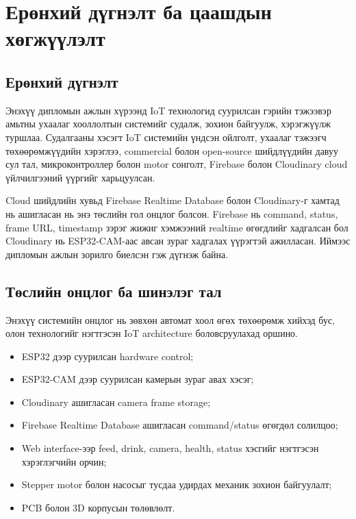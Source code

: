 \documentclass[12pt,a4paper]{report}
\begin{document}
\chapter{Ерөнхий дүгнэлт ба цаашдын хөгжүүлэлт}

\section{Ерөнхий дүгнэлт}

Энэхүү дипломын ажлын хүрээнд IoT технологид суурилсан гэрийн тэжээвэр амьтны ухаалаг хооллолтын системийг судалж, зохион байгуулж, хэрэгжүүлж туршлаа. Судалгааны хэсэгт IoT системийн үндсэн ойлголт, ухаалаг тэжээгч төхөөрөмжүүдийн хэрэглээ, commercial болон open-source шийдлүүдийн давуу сул тал, микроконтроллер болон motor сонголт, Firebase болон Cloudinary cloud үйлчилгээний үүргийг харьцуулсан.

Cloud шийдлийн хувьд Firebase Realtime Database болон Cloudinary-г хамтад нь ашигласан нь энэ төслийн гол онцлог болсон. Firebase нь command, status, frame URL, timestamp зэрэг жижиг хэмжээний realtime өгөгдлийг хадгалсан бол Cloudinary нь ESP32-CAM-аас авсан зураг хадгалах үүрэгтэй ажилласан. Иймээс дипломын ажлын зорилго биелсэн гэж дүгнэж байна.

\section{Төслийн онцлог ба шинэлэг тал}

Энэхүү системийн онцлог нь зөвхөн автомат хоол өгөх төхөөрөмж хийхэд бус, олон технологийг нэгтгэсэн IoT architecture боловсруулахад оршино.

\begin{itemize}[leftmargin=1.2cm]
  \item ESP32 дээр суурилсан hardware control;
  \item ESP32-CAM дээр суурилсан камерын зураг авах хэсэг;
  \item Cloudinary ашигласан camera frame storage;
  \item Firebase Realtime Database ашигласан command/status өгөгдөл солилцоо;
  \item Web interface-ээр feed, drink, camera, health, status хэсгийг нэгтгэсэн хэрэглэгчийн орчин;
  \item Stepper motor болон насосыг тусдаа удирдах механик зохион байгуулалт;
  \item PCB болон 3D корпусын төлөвлөлт.
\end{itemize}
\end{document}
